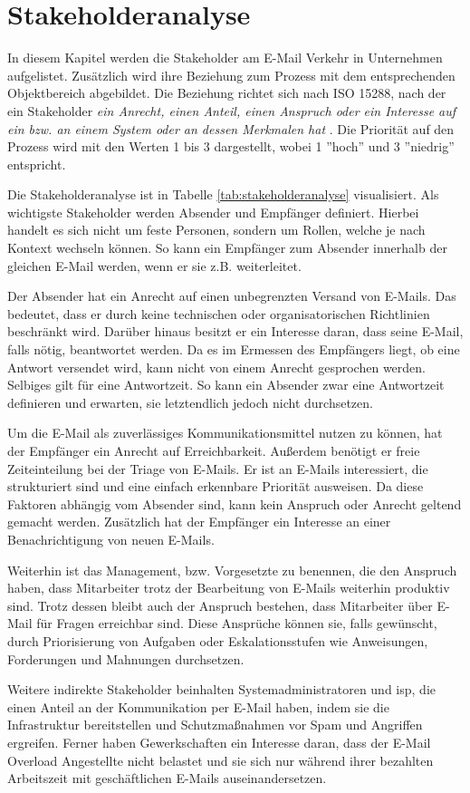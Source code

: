 
\chapter{Stakeholderanalyse}
\label{Stakeholderanalyse}

In diesem Kapitel werden die Stakeholder am E-Mail Verkehr in Unternehmen aufgelistet. Zusätzlich wird ihre Beziehung zum Prozess mit dem entsprechenden Objektbereich abgebildet. Die Beziehung richtet sich nach ISO 15288, nach der ein Stakeholder \emph{\glqq ein Anrecht, einen Anteil, einen Anspruch oder ein Interesse auf ein bzw. an einem System oder an dessen Merkmalen hat\grqq} \citep{ISO2015}. Die Priorität auf den Prozess wird mit den Werten 1 bis 3 dargestellt, wobei 1 ''hoch'' und 3 ''niedrig'' entspricht.

Die Stakeholderanalyse ist in Tabelle \ref{tab:stakeholderanalyse} visualisiert. Als wichtigste Stakeholder werden Absender und Empfänger definiert. Hierbei handelt es sich nicht um feste Personen, sondern um Rollen, welche je nach Kontext wechseln können. So kann ein Empfänger zum Absender innerhalb der gleichen E-Mail werden, wenn er sie z.B. weiterleitet.

Der Absender hat ein Anrecht auf einen unbegrenzten Versand von E-Mails. Das bedeutet, dass er durch keine technischen oder organisatorischen Richtlinien beschränkt wird. Darüber hinaus besitzt er ein Interesse daran, dass seine E-Mail, falls nötig, beantwortet werden. Da es im Ermessen des Empfängers liegt, ob eine Antwort versendet wird, kann nicht von einem Anrecht gesprochen werden. Selbiges gilt für eine Antwortzeit. So kann ein Absender zwar eine Antwortzeit definieren und erwarten, sie letztendlich jedoch nicht durchsetzen.

Um die E-Mail als zuverlässiges Kommunikationsmittel nutzen zu können, hat der Empfänger ein Anrecht auf Erreichbarkeit. Außerdem benötigt er freie Zeiteinteilung bei der Triage von E-Mails. Er ist an E-Mails interessiert, die strukturiert sind und eine einfach erkennbare Priorität ausweisen. Da diese Faktoren abhängig vom Absender sind, kann kein Anspruch oder Anrecht geltend gemacht werden. Zusätzlich hat der Empfänger ein Interesse an einer Benachrichtigung von neuen E-Mails.

Weiterhin ist das Management, bzw. Vorgesetzte zu benennen, die den Anspruch haben, dass Mitarbeiter trotz der Bearbeitung von E-Mails weiterhin produktiv sind. Trotz dessen bleibt auch der Anspruch bestehen, dass Mitarbeiter über E-Mail für Fragen erreichbar sind. Diese Ansprüche können sie, falls gewünscht, durch Priorisierung von Aufgaben oder Eskalationsstufen wie Anweisungen, Forderungen und Mahnungen durchsetzen.

Weitere indirekte Stakeholder beinhalten Systemadministratoren und \acrfull{isp}, die einen Anteil an der Kommunikation per E-Mail haben, indem sie die Infrastruktur bereitstellen und Schutzmaßnahmen vor Spam und Angriffen ergreifen. Ferner haben Gewerkschaften ein Interesse daran, dass der E-Mail Overload Angestellte nicht belastet und sie sich nur während ihrer bezahlten Arbeitszeit mit geschäftlichen E-Mails auseinandersetzen.   
